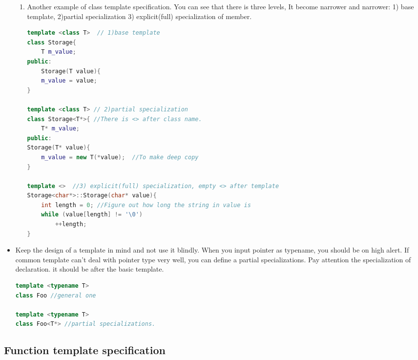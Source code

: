 \documentclass[a4paper,11pt,twoside]{book}
\begin{document}
\begin{itemize}
\begin{enumerate}
		\item Another example of class template specification. You can see that there is three levels, It become narrower and narrower: 1) base template, 2)partial specialization 3) explicit(full) specialization of member.
\begin{lstlisting}[frame=single, language=c++]
template <class T>  // 1)base template
class Storage{
	T m_value;
public:
	Storage(T value){
	m_value = value;
}

template <class T> // 2)partial specialization
class Storage<T*>{ //There is <> after class name.
	T* m_value;
public:
Storage(T* value){
	m_value = new T(*value);  //To make deep copy
}

template <>  //3) explicit(full) specialization, empty <> after template
Storage<char*>::Storage(char* value){
	int length = 0; //Figure out how long the string in value is
	while (value[length] != '\0')
		++length;
}
\end{lstlisting}

\end{enumerate}

    \item Keep the design of a template in mind and not use it blindly. When you input pointer as typename, you should be on high alert. If common template can't deal with pointer type very well, you can define a partial specializations. Pay attention the specialization of declaration. it should be after the basic template.

\begin{lstlisting}[frame=single, language=c++]
template <typename T>
class Foo //general one

template <typename T>
class Foo<T*> //partial specializations.
\end{lstlisting}

\end{itemize}

\subsection{Function template specification}
\end{document}
